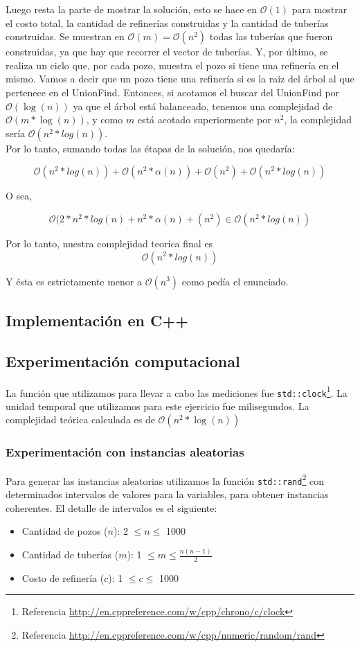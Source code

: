 Luego resta la parte de mostrar la solución, esto se hace en $\mathcal{O}(1)$ para mostrar el costo total, la cantidad de refinerías construidas y la cantidad de tuberías construidas. Se muestran en $\mathcal{O}(m) = \mathcal{O}(n^2)$ todas las tuberías que fueron construidas, ya que hay que recorrer el vector de tuberías. Y, por último, se realiza un ciclo que, por cada pozo, muestra el pozo si tiene una refinería en el mismo. Vamos a decir que un pozo tiene una refinería si es la raiz del árbol al que pertenece en el UnionFind. Entonces, si acotamos el buscar del UnionFind por $\mathcal{O}(\log(n))$ ya que el árbol está balanceado, tenemos una complejidad de $\mathcal{O}(m*\log(n))$, y como $m$ está acotado superiormente por $n^2$, la complejidad sería $\mathcal{O}(n^2*log(n))$. \\

Por lo tanto, sumando todas las étapas de la solución, nos quedaría:

$$\mathcal{O}(n^2*log(n)) + \mathcal{O}(n^2*\alpha(n)) + \mathcal{O}(n^2) + \mathcal{O}(n^2*log(n))$$

O sea,

$$\mathcal{O}(2*n^2*log(n) + n^2*\alpha(n) +(n^2) \in \mathcal{O}(n^2*log(n)) $$

Por lo tanto, nuestra complejidad teoríca final es
$$\mathcal{O}(n^2*log(n))$$

Y ésta es estrictamente menor a  $\mathcal{O}(n^3)$ como pedía el enunciado.

\newpage
\subsection{Implementación en C++}


\newpage
\subsection{Experimentación computacional}
La función que utilizamos para llevar a cabo las mediciones fue \texttt{std::clock}\footnote{Referencia \url{http://en.cppreference.com/w/cpp/chrono/c/clock}}. La unidad temporal que utilizamos para este ejercicio fue milisegundos.
La complejidad teórica calculada es de $\mathcal{O}(n^2* \log(n))$


\subsubsection{Experimentación con instancias aleatorias}
Para generar las instancias aleatorias utilizamos la función \texttt{std::rand}\footnote{Referencia \url{http://en.cppreference.com/w/cpp/numeric/random/rand}} con determinados intervalos de valores para la variables, para obtener instancias coherentes. El detalle de intervalos es el siguiente:
\begin{itemize}
	\item Cantidad de pozos ($n$): 2 $\leq n \leq$ 1000
    \item Cantidad de tuberías ($m$): 1 $\leq m \leq \frac{n(n-1)}{2}$
    \item Costo de refinería ($c$): 1 $\leq c \leq$ 1000
\end{itemize}

